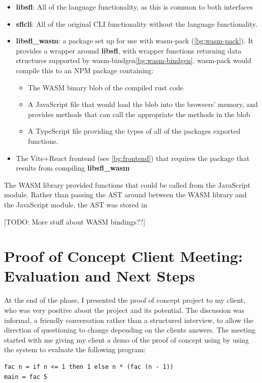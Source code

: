\begin{itemize}
    \item \textbf{libsfl}: All of the language functionality, as this is common to both interfaces
    \item \textbf{sflcli}: All of the original CLI functionality without the language functionality.  
    \item \textbf{libsfl\_wasm}: a package set up for use with wasm-pack (\ref{bg:wasm-pack}). It provides a wrapper around \textbf{libsfl}, with wrapper functions returning data structures supported by wasm-bindgen\ref{bg:wasm-bindgen}. wasm-pack would compile this to an \ac{NPM} package containing:
    \begin{itemize}
        \item The WASM binary blob of the compiled rust code
        \item A JavaScript file that would load the blob into the browsers' memory, and provides methods that can call the appropriate the methods in the blob
        \item A TypeScript file providing the types of all of the packages exported functions. 
    \end{itemize}
    \item The Vite+React frontend (see \ref{bg:frontend}) that requires the package that results from compiling \textbf{libsfl\_wasm}
\end{itemize}

The \ac{WASM} library provided functions that could be called from the JavaScript module. Rather than passing the \ac{AST} around between the \ac{WASM} library and the JavaScript module, the \ac{AST} was stored in




[TODO: More stuff about WASM bindings??]

\section{Proof of Concept Client Meeting: Evaluation and \newline Next Steps}
\label{eval:c1_client}
At the end of the phase, I presented the proof of concept project to my client, who was very positive about the project and its potential. The discussion was informal, a friendly conversation rather than a structured interview, to allow the direction of questioning to change depending on the clients answers. The meeting started with me giving my client a demo of the proof of concept using by using the system to evaluate the following program:
\begin{verbatim}
fac n = if n <= 1 then 1 else n * (fac (n - 1))
main = fac 5
\end{verbatim}


